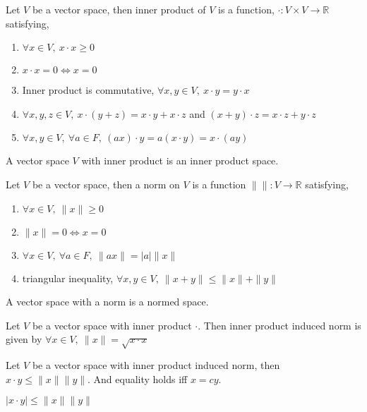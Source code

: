 	\begin{axiom}
		Let $V$ be a vector space, then inner product of $V$ is a function, $\cdot : V \times V \to \mathbb{R}$ satisfying,
		\begin{enumerate}
			\item $\forall x \in V,\ x \cdot x \ge 0$
			\item $x \cdot x = 0 \iff x = 0$
			\item Inner product is commutative, $\forall x,y \in V,\ x \cdot y = y \cdot x$
			\item $\forall x,y,z \in V,\ x \cdot (y + z) = x \cdot y + x \cdot z$ and $(x + y) \cdot z = x \cdot z + y \cdot z$
			\item $\forall x,y \in V,\ \forall a \in F,\ (ax) \cdot y = a(x \cdot y) = x \cdot (ay)$
		\end{enumerate}
	\end{axiom}
	\begin{definition}
		A vector space $V$ with inner product is an inner product space.
	\end{definition}
	\begin{axiom}
		Let $V$ be a vector space, then a norm on $V$ is a function $\| \| : V \to \mathbb{R}$ satisfying,
		\begin{enumerate}
			\item $\forall x \in V,\ \|x\| \ge 0$
			\item $\|x\| = 0 \iff x = 0$
			\item $\forall x \in V,\ \forall a \in F,\ \|ax\| = |a|\|x\|$
			\item triangular inequality, $\forall x,y \in V,\ \|x+y\| \le \|x\|+\|y\|$
		\end{enumerate}
	\end{axiom}
	\begin{definition}
		A vector space with a norm is a normed space.
	\end{definition}
	\begin{remark}
		Let $V$ be a vector space with inner product $\cdot$. Then inner product induced norm is given by $\forall x \in V,\ \|x\| = \sqrt{x \cdot x}$
	\end{remark}
	\begin{theorem}
		Let $V$ be a vector space with inner product induced norm, then $x \cdot y \le \|x\| \|y\|$. And equality holds iff $x = cy$.
	\end{theorem}
	\begin{corollary}
		$|x \cdot y| \le \|x\| \|y\|$
	\end{corollary}
